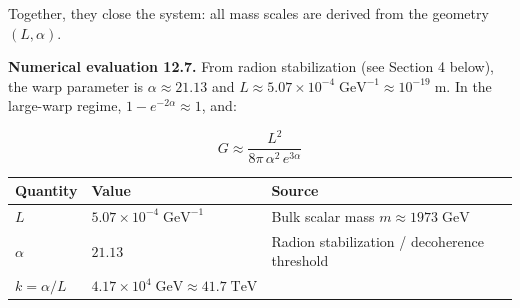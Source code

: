 \documentclass[
  11pt,
]{article}
\begin{document}
Together, they close the system: all mass scales are derived from the
geometry \((L, \alpha)\).

\textbf{Numerical evaluation 12.7.} From radion stabilization (see
Section 4 below), the warp parameter is \(\alpha \approx 21.13\) and
\(L \approx 5.07 \times 10^{-4}\;\text{GeV}^{-1} \approx 10^{-19}\;\text{m}\).
In the large-warp regime, \(1 - e^{-2\alpha} \approx 1\), and:

\[G \approx \frac{L^2}{8\pi\,\alpha^2\,e^{3\alpha}} \tag{52}\]

\begin{longtable}[]{@{}lll@{}}
\toprule
\begin{minipage}[b]{0.30\columnwidth}\raggedright
Quantity\strut
\end{minipage} & \begin{minipage}[b]{0.30\columnwidth}\raggedright
Value\strut
\end{minipage} & \begin{minipage}[b]{0.30\columnwidth}\raggedright
Source\strut
\end{minipage}\tabularnewline
\midrule
\endhead
\begin{minipage}[t]{0.30\columnwidth}\raggedright
\(L\)\strut
\end{minipage} & \begin{minipage}[t]{0.30\columnwidth}\raggedright
\(5.07 \times 10^{-4}\;\text{GeV}^{-1}\)\strut
\end{minipage} & \begin{minipage}[t]{0.30\columnwidth}\raggedright
Bulk scalar mass \(m \approx 1973\;\text{GeV}\)\strut
\end{minipage}\tabularnewline
\begin{minipage}[t]{0.30\columnwidth}\raggedright
\(\alpha\)\strut
\end{minipage} & \begin{minipage}[t]{0.30\columnwidth}\raggedright
\(21.13\)\strut
\end{minipage} & \begin{minipage}[t]{0.30\columnwidth}\raggedright
Radion stabilization / decoherence threshold\strut
\end{minipage}\tabularnewline
\begin{minipage}[t]{0.30\columnwidth}\raggedright
\(k = \alpha/L\)\strut
\end{minipage} & \begin{minipage}[t]{0.30\columnwidth}\raggedright
\(4.17 \times 10^{4}\;\text{GeV} \approx 41.7\;\text{TeV}\)\strut
\end{minipage} & \begin{minipage}[t]{0.30\columnwidth}\raggedright

\end{minipage}
\end{longtable}
\end{document}
